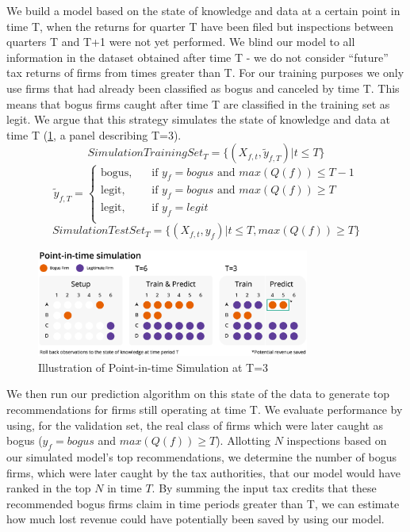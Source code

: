 We build a model based on the state of knowledge and data at a certain point in time T, when the returns for quarter T have been filed but inspections between quarters T and T+1 were not yet performed. We blind our model to all information in the dataset obtained after time T - we do not consider ``future'' tax returns of firms from times greater than T. For our training purposes we only use firms that had already been classified as bogus and canceled by time T. This means that bogus firms caught after time T are classified in the training set as legit. We argue that this strategy simulates the state of knowledge and data at time T (\cref{fig:PointInTimeSchematic}, a panel describing T=3).
\[SimulationTrainingSet_T = \{(X_{f,t},\tilde{y}_{f,T}) | t\le T\}\]
\[   
\tilde{y}_{f,T} =
     \begin{cases}
       \text{bogus,} &\quad\text{if $y_f=bogus$ and $max(Q(f)) \le T-1$} \\
       \text{legit,} &\quad\text{if $y_f=bogus$ and $max(Q(f)) \ge T$} \\
       \text{legit,} &\quad\text{if $y_f=legit$} \\
     \end{cases}
\]
\[SimulationTestSet_T = \{(X_{f,t},y_f) | t\le T,max(Q(f)) \ge T\}\]

\begin{figure}[t!]
  \includegraphics[width=0.8\textwidth]{graphs/PointInTimeModel.png}
  \caption{Illustration of Point-in-time Simulation at T=3}
  \label{fig:PointInTimeSchematic}
\end{figure}

We then run our prediction algorithm on this state of the data to generate top recommendations for firms still operating at time T. We evaluate performance by using, for the validation set, the real class of firms which were later caught as bogus ($y_f=bogus$ and $max(Q(f)) \ge T$). Allotting $N$ inspections based on our simulated model's top recommendations, we determine the number of bogus firms, which were later caught by the tax authorities, that our model would have ranked in the top $N$ in time $T$. By summing the input tax credits that these recommended bogus firms claim in time periods greater than T, we can estimate how much lost revenue could have potentially been saved by using our model.

